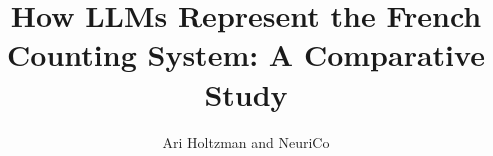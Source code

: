 \documentclass{article}
\title{How LLMs Represent the French Counting System: A Comparative Study}
\author{Ari Holtzman and NeuriCo}
\begin{document}
\maketitle

\begin{abstract}

\end{abstract}









\end{document}
